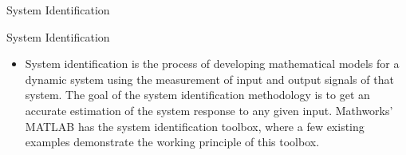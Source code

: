 \documentclass{beamer}
\begin{document}
\begin{frame}{System Identification}
  \begin{block}{System Identification}
 \begin{itemize}
        \item System identification is the process of developing mathematical models for a dynamic system using the measurement of input and output signals of that system. The goal of the system identification methodology is to get an accurate estimation of the system response to any given input. Mathworks' MATLAB has the system identification toolbox, where a few existing examples demonstrate the working principle of this toolbox.
\end{itemize}
  \end{block}
\end{frame}




\end{document}
